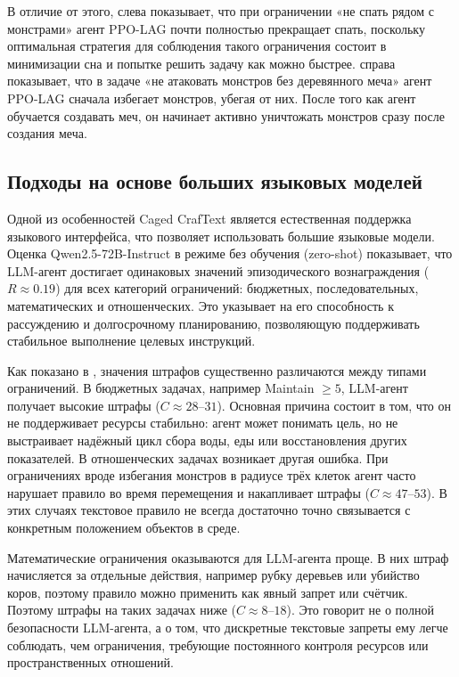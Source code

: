 В отличие от этого,  слева показывает, что при ограничении «не спать рядом с монстрами» агент PPO-LAG почти полностью прекращает спать, поскольку оптимальная стратегия для соблюдения такого ограничения состоит в минимизации сна и попытке решить задачу как можно быстрее.  справа показывает, что в задаче «не атаковать монстров без деревянного меча» агент PPO-LAG сначала избегает монстров, убегая от них. После того как агент обучается создавать меч, он начинает активно уничтожать монстров сразу после создания меча.

\subsection{Подходы на основе больших языковых моделей}
\label{sec:craftext_rq4}

Одной из особенностей Caged CrafText является естественная поддержка языкового интерфейса, что позволяет использовать большие языковые модели. Оценка Qwen2.5-72B-Instruct в режиме без обучения (zero-shot) показывает, что LLM-агент достигает одинаковых значений эпизодического вознаграждения ($R \approx 0.19$) для всех категорий ограничений: бюджетных, последовательных, математических и отношенческих. Это указывает на его способность к рассуждению и долгосрочному планированию, позволяющую поддерживать стабильное выполнение целевых инструкций.

Как показано в , значения штрафов существенно различаются между типами ограничений. В бюджетных задачах, например Maintain  $\geq 5$, LLM-агент получает высокие штрафы ($C \approx 28$--$31$). Основная причина состоит в том, что он не поддерживает ресурсы стабильно: агент может понимать цель, но не выстраивает надёжный цикл сбора воды, еды или восстановления других показателей. В отношенческих задачах возникает другая ошибка. При ограничениях вроде избегания монстров в радиусе трёх клеток агент часто нарушает правило во время перемещения и накапливает штрафы ($C \approx 47$--$53$). В этих случаях текстовое правило не всегда достаточно точно связывается с конкретным положением объектов в среде.

Математические ограничения оказываются для LLM-агента проще. В них штраф начисляется за отдельные действия, например рубку деревьев или убийство коров, поэтому правило можно применить как явный запрет или счётчик. Поэтому штрафы на таких задачах ниже ($C \approx 8$--$18$). Это говорит не о полной безопасности LLM-агента, а о том, что дискретные текстовые запреты ему легче соблюдать, чем ограничения, требующие постоянного контроля ресурсов или пространственных отношений.

